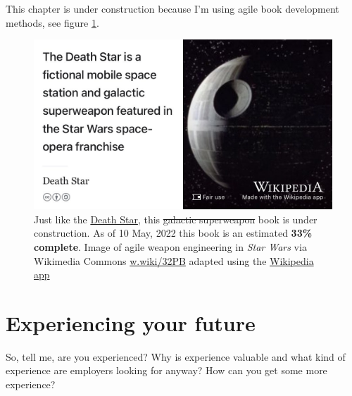 \documentclass[
]{book}
\begin{document}
This chapter is under construction because I'm using agile book development methods, see figure \ref{fig:deathstar-fig}.

\begin{figure}

{\centering \includegraphics[width=0.99\linewidth]{images/DeathStar2} 

}

\caption{Just like the \href{https://en.wikipedia.org/wiki/Death_Star}{Death Star}, this \sout{galactic superweapon} book is under construction. As of 10 May, 2022 this book is an estimated \textbf{33\% complete}. Image of agile weapon engineering in \emph{Star Wars} via Wikimedia Commons \href{https://w.wiki/32PB}{w.wiki/32PB} adapted using the \href{https://apps.apple.com/gb/app/wikipedia/id324715238}{Wikipedia app}}\label{fig:deathstar-fig}
\end{figure}



\hypertarget{experiencing}{%
\chapter{Experiencing your future}\label{experiencing}}

So, tell me, are you experienced? Why is experience valuable and what kind of experience are employers looking for anyway? How can you get some more experience? 🤔
\end{document}
